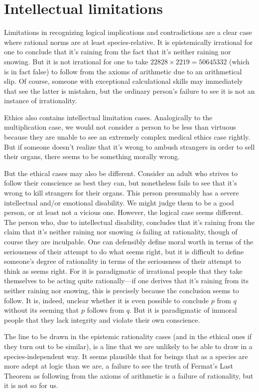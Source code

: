 \section{Intellectual limitations}
Limitations in recognizing logical implications and contradictions are a clear case where rational norms are at
least species-relative. It is epistemically irrational for one to conclude that it's raining from the fact that it's neither 
raining nor snowing. But it is not irrational for one to take $22828 \times 2219 = 50645332$ (which is in fact
false) to follow from the axioms of arithmetic due to an arithmetical slip. Of course, someone with 
exceptional calculational skills may immediately that see the latter is mistaken, but the ordinary person's failure to see it is 
not an instance of irrationality. 

Ethics also contains intellectual limitation cases. Analogically to the multiplication
case, we would not consider a person to be less than virtuous because they are unable to see an extremely complex medical 
ethics case rightly. But if someone doesn't realize that it's wrong to ambush strangers in order to sell their organs,
there seems to be something morally wrong.

But the ethical cases may also be different. Consider an adult who strives to follow their conscience as best they can,
but nonetheless fails to see that it's wrong to kill strangers for their organs. This person presumably has
a severe intellectual and/or emotional disability. We might judge them to be a good person, or at least not a vicious one. 
However, the logical case seems different. The person who, due to intellectual disability, concludes that it's raining 
from the claim that it's neither raining nor snowing \textit{is} failing at rationality, though of course they are 
inculpable. One can defensibly define moral worth in terms of the seriousness of their attempt to do what seems right, but
it is difficult to define someone's degree of rationality in terms of the seriousness of their attempt to think as seems
right. For it is paradigmatic of irrational people that they take themselves to be acting quite rationally---if one
derives that it's raining from its neither raining nor snowing, this is precisely because the conclusion seems to follow.
It is, indeed, unclear whether it is even possible to conclude $p$ from $q$ without its seeming that $p$ follows from $q$.
But it is paradigmatic of immoral people that they lack integrity and violate their own conscience. 

The line to be drawn in the epistemic rationality cases (and in the ethical ones if they turn out to be similar), is a line that we 
are unlikely to be able to draw in a species-independent way. It seems plausible that for beings that as a species are 
more adept at logic than we are, a failure to see the truth of Fermat's Last Theorem as following from the axioms of
arithmetic is a failure of rationality, but it is not so for us. 


